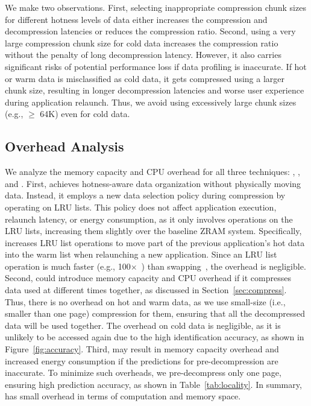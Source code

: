 We make two observations. 
First, selecting inappropriate compression chunk sizes for different hotness levels of data either increases the compression and decompression latencies or reduces the compression ratio. 
Second, using a very large compression chunk size for cold data increases the compression ratio without the penalty of long decompression latency. 
However, it also carries significant risks of potential performance loss if data profiling is inaccurate. If hot or warm data is misclassified as cold data, it gets compressed using a larger chunk size, resulting in longer decompression latencies and worse user experience during application relaunch. Thus, we avoid using excessively large chunk sizes (e.g., $\geq$ 64K) even for cold data. 

\subsection{Overhead Analysis}

We analyze the memory capacity and CPU overhead for all three techniques: \dataorg, \compress, and \predi.
First, \dataorg achieves hotness-aware data organization without physically moving data. Instead, it employs a new data selection policy during compression by operating on LRU lists. This policy does not affect application execution, relaunch latency, or energy consumption, as it only involves operations on the LRU lists,  increasing them slightly over the baseline ZRAM system. 
Specifically, \proposal increases LRU list operations to move part of the previous application's hot data into the warm list when relaunching a new application. 
Since an LRU list operation is much faster (e.g., 100$\times$~\cite{DRAMFAST}) than swapping~\cite{kim2019ezswap,zhu2017smartswap}, the overhead is negligible. 
Second, \compress could introduce memory capacity and CPU overhead if it compresses data used at different times together, as discussed in Section~\ref{sec:compress}. Thus, there is no overhead on hot and warm data, as we use small-size (i.e., smaller than one page) compression for them, ensuring that all the decompressed data will be used together. The overhead on cold data is negligible, as it is unlikely to be accessed again due to the high identification accuracy, as shown in Figure~\ref{fig:accuracy}.
Third, \predi may result in memory capacity overhead and increased energy consumption if the predictions for pre-decompression are inaccurate. To minimize such overheads, we pre-decompress only one page, ensuring high prediction accuracy, as shown in Table~\ref{tab:locality}. 
In summary, \proposal has small overhead in terms of computation and memory space.




